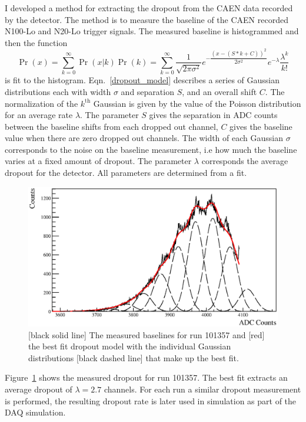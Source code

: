 I developed a method for extracting the dropout from the CAEN data
recorded by the detector.
The method is to measure the baseline of the CAEN recorded N100-Lo and N20-Lo
trigger signals.
The measured baseline is histogrammed and then the function
\begin{equation}
    \Pr(x) = \sum_{k=0}^{\infty}\Pr(x | k)\Pr(k) = \sum_{k=0}^{\infty} \dfrac{1}{\sqrt{2 \pi \sigma^2}} e^{-\dfrac{(x - (S*k + C))^2}{2 \sigma^2}} e^{-\lambda}\dfrac{\lambda^{k}}{k!}
    \label{dropout_model}
\end{equation}
is fit to the histogram. Eqn.~\ref{dropout_model} describes a series of Gaussian
distributions each with width $\sigma$ and separation $S$, and an overall shift $C$.
The normalization of the $k^{\text{th}}$ Gaussian is given by the value of the Poisson
distribution for an average rate $\lambda$.
The parameter $S$ gives the separation in ADC counts
between the baseline shifts from each dropped out channel, $C$ gives the baseline
value when there are zero dropped out channels.
The width of each Gaussian $\sigma$ corresponds to the noise on the baseline
measurement, i.e how much the baseline varies at a fixed amount of dropout.
The parameter $\lambda$ corresponds the average dropout for the detector.
All parameters are determined from a fit.

\begin{figure}[htbp]
    \centering
    \includegraphics[width=1\textwidth]{dropout_example}
    \caption[Dropout Fit Example]{[black solid line] The measured baselines
    for run 101357 and [red] the best fit dropout model with the
    individual Gaussian distributions [black dashed line] that make up the best fit.}
\label{fig:dropoutexample}
\end{figure}


Figure~\ref{fig:dropoutexample} shows the measured dropout for run 101357.
The best fit extracts an average dropout of $\lambda=2.7$ channels.
For each run a similar dropout measurement is performed, the resulting dropout
rate is later used in simulation as part of the DAQ simulation.

